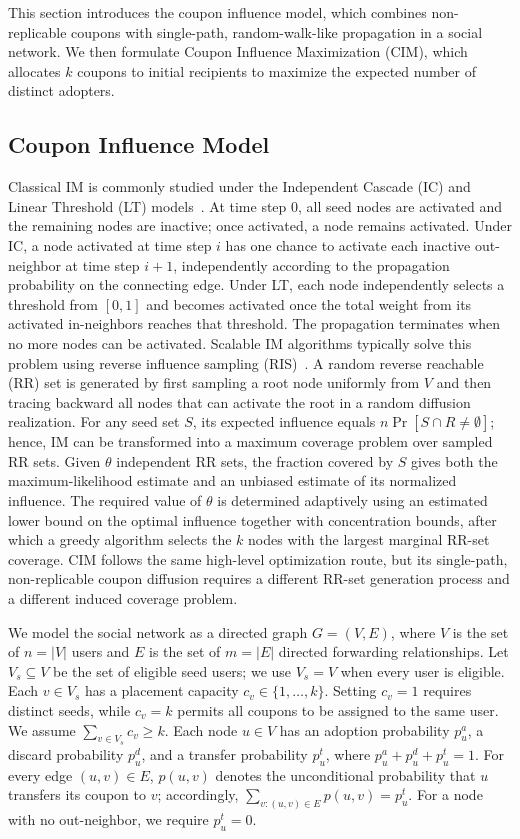 \documentclass[sigconf,balance=false]{acmart}
\begin{document}
This section introduces the coupon influence model, which combines
non-replicable coupons with single-path, random-walk-like propagation in a
social network. We then formulate Coupon Influence Maximization (CIM), which
allocates $k$ coupons to initial recipients to maximize the expected number of
distinct adopters.

\subsection{Coupon Influence Model}

Classical IM is commonly studied under the Independent Cascade (IC) and
Linear Threshold (LT) models~\cite{kempe2003maximizing}.
At time step $0$, all seed nodes are activated and the remaining nodes
are inactive; once activated, a node remains activated.
Under IC, a node activated at time step $i$ has one chance to activate
each inactive out-neighbor at time step $i+1$, independently according
to the propagation probability on the connecting edge.
Under LT, each node independently selects a threshold from $[0,1]$ and
becomes activated once the total weight from its activated in-neighbors
reaches that threshold.
The propagation terminates when no more nodes can be activated.
Scalable IM algorithms typically solve this problem using reverse
influence sampling (RIS)~\cite{borgs2014maximizing,tang2015influence}.
A random reverse reachable (RR) set is generated by first sampling a root
node uniformly from $V$ and then tracing backward all nodes that can
activate the root in a random diffusion realization.
For any seed set $S$, its expected influence equals
$n\Pr[S\cap R\neq\emptyset]$; hence, IM can be transformed into a maximum
coverage problem over sampled RR sets.
Given $\theta$ independent RR sets, the fraction covered by $S$ gives
both the maximum-likelihood estimate and an unbiased estimate of its
normalized influence.
The required value of $\theta$ is determined adaptively using an
estimated lower bound on the optimal influence together with
concentration bounds, after which a greedy algorithm selects the $k$
nodes with the largest marginal RR-set coverage.
CIM follows the same high-level optimization route, but its single-path,
non-replicable coupon diffusion requires a different RR-set generation
process and a different induced coverage problem.

We model the social network as a directed graph $G=(V,E)$, where $V$ is
the set of $n=|V|$ users and $E$ is the set of $m=|E|$ directed
forwarding relationships.
Let $V_s\subseteq V$ be the set of eligible seed users; we use $V_s=V$
when every user is eligible.
Each $v\in V_s$ has a placement capacity $c_v\in\{1,\ldots,k\}$.
Setting $c_v=1$ requires distinct seeds, while $c_v=k$ permits all
coupons to be assigned to the same user.
We assume $\sum_{v\in V_s}c_v\geq k$.
Each node $u\in V$ has an adoption probability $p_u^a$, a discard
probability $p_u^d$, and a transfer probability $p_u^t$, where
$p_u^a+p_u^d+p_u^t=1$.
For every edge $(u,v)\in E$, $p(u,v)$ denotes the unconditional
probability that $u$ transfers its coupon to $v$; accordingly,
$\sum_{v:(u,v)\in E}p(u,v)=p_u^t$.
For a node with no out-neighbor, we require $p_u^t=0$.
\end{document}
